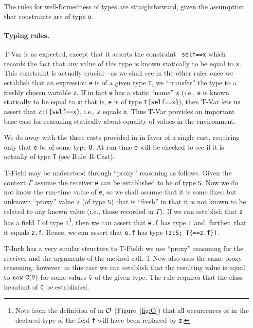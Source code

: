 The rules for well-formedness of types are straightforward, given 
the assumption that constraints are of type {\tt o}.

\paragraph{Typing rules.}
{\sc T-Var} is as expected, except that it asserts the constraint {\tt
self==x} which records the fact that any value of this type is known
statically to be equal to {\tt x}. This constraint is actually 
crucial---as we shall see in the other rules once we establish that
an expression {\tt e} is of a given type {\tt T}, we ``transfer'' the
type to a freshly chosen variable {\tt z}. If in fact {\tt e} has a
static ``name'' {\tt x} (i.e., {\tt e} is known statically to be
equal to {\tt x}; that is, {\tt e} is of type {\tt T\{self==x\}}), then
{\sc T-Var} lets us assert that {\tt z:T\{self==x\}}, i.e., {\tt z}
equals {\tt x}. Thus {\sc T-Var} provides an important base case for
reasoning statically about equality of values in the environment.

We do away with the three casts provided in \FJ{} in favor of a single
cast, requiring only that {\tt e} be of some type {\tt U}. At run time
{\tt e} will be checked to see if it is actually of type {\tt T} (see
Rule~{\sc R-Cast}).

{\sc T-Field} may be understood through ``proxy'' reasoning as
follows.  Given the context $\Gamma$ assume the receiver {\tt e} can
be established to be of type {\tt S}. Now we do not know the run-time
value of {\tt e}, so we shall assume that it is some fixed but unknown
``proxy'' value {\tt z} (of type {\tt S}) that is ``fresh'' in that it
is not known to be related to any known value (i.e., those recorded
in $\Gamma$).  If we can establish that {\tt z} has a field {\tt f} of
type {\tt T}\footnote{Note from the definition of \fields{} in
${\cal O}$ (Figure~\ref{fig:O}) that all occurrences of \this{}
in the declared type of the field {\tt f} will have been
replaced by {\tt z}.}, then we can assert that {\tt e.f} has
type {\tt T} and, further, that it equals {\tt z.f}.  Hence, we
can assert that {\tt e.f} has type {\tt (z:S;\,T\{\self==z.f\})}.

{\sc T-Invk} has a very similar structure to {\sc T-Field}: we use
``proxy'' reasoning for the receiver and the arguments of the method
call. {\sc T-New} also uses the same proxy reasoning; however, in this case
we can establish that the resulting value is equal to ${\tt new\ C(\bar{\tt v})}$
for some values $\bar{\tt v}$ of the given type.  The rule
requires that the class invariant of {\tt C} be established.

